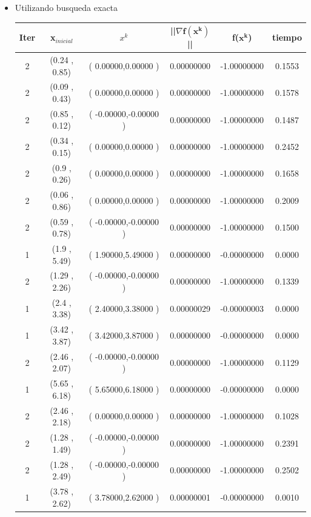
\begin{itemize}

\item Utilizando busqueda exacta

\begin{table}[H]
\centering
\renewcommand{\arraystretch}{1.2} %
\begin{tabular}{|c|c|c|c|c|c|}
\hline
\textbf{Iter} & \textbf{x$_{inicial}$} & \textbf{$x^k$} & \textbf{||$\nabla \mathbf{f(x^k)}$}|| & \textbf{f($\mathbf{x^k}$)}& \textbf{tiempo} \\
\hline
2  &  (0.24 , 0.85) &( 0.00000,0.00000 ) & 0.00000000 & -1.00000000 & 0.1553 \\
2  &  (0.09 , 0.43) &( 0.00000,0.00000 ) & 0.00000000 & -1.00000000 & 0.1578 \\
2  &  (0.85 , 0.12) &( -0.00000,-0.00000 ) & 0.00000000 & -1.00000000 & 0.1487 \\
2  &  (0.34 , 0.15) &( 0.00000,0.00000 ) & 0.00000000 & -1.00000000 & 0.2452 \\
2  &  (0.9 , 0.26) &( 0.00000,0.00000 ) & 0.00000000 & -1.00000000 & 0.1658 \\
2  &  (0.06 , 0.86) &( 0.00000,0.00000 ) & 0.00000000 & -1.00000000 & 0.2009 \\
2  &  (0.59 , 0.78) &( -0.00000,-0.00000 ) & 0.00000000 & -1.00000000 & 0.1500 \\
1  &  (1.9 , 5.49) &( 1.90000,5.49000 ) & 0.00000000 & -0.00000000 & 0.0000 \\
2  &  (1.29 , 2.26) &( -0.00000,-0.00000 ) & 0.00000000 & -1.00000000 & 0.1339 \\
1  &  (2.4 , 3.38) &( 2.40000,3.38000 ) & 0.00000029 & -0.00000003 & 0.0000 \\
1  &  (3.42 , 3.87) &( 3.42000,3.87000 ) & 0.00000000 & -0.00000000 & 0.0000 \\
2  &  (2.46 , 2.07) &( -0.00000,-0.00000 ) & 0.00000000 & -1.00000000 & 0.1129 \\
1  &  (5.65 , 6.18) &( 5.65000,6.18000 ) & 0.00000000 & -0.00000000 & 0.0000 \\
2  &  (2.46 , 2.18) &( 0.00000,0.00000 ) & 0.00000000 & -1.00000000 & 0.1028 \\
2  &  (1.28 , 1.49) &( -0.00000,-0.00000 ) & 0.00000000 & -1.00000000 & 0.2391 \\
2  &  (1.28 , 2.49) &( -0.00000,-0.00000 ) & 0.00000000 & -1.00000000 & 0.2502 \\
1  &  (3.78 , 2.62) &( 3.78000,2.62000 ) & 0.00000001 & -0.00000000 & 0.0010 \\
\hline
\end{tabular}
\end{table}



\end{itemize}

